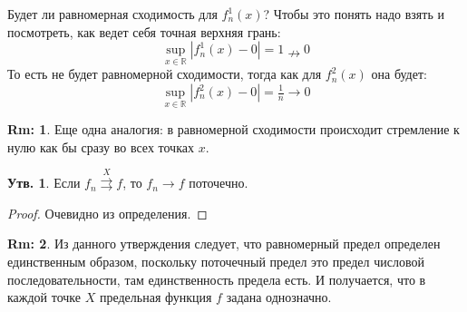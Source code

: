 \documentclass[12pt]{article}
\newcommand{\MR}{\mathbb{R}}
\theoremstyle{definition}
\newtheorem{rem}{Rm:}
\newtheorem{prop}{Утв.}
\newcommand{\uconv}[1]{\overset{#1}{\rightrightarrows}}
\begin{document}
Будет ли равномерная сходимость для $f^1_n(x)$? Чтобы это понять надо взять и посмотреть, как ведет себя точная верхняя грань:
$$
	\sup\limits_{x \in \MR}|f_n^1(x) - 0| = 1 \nrightarrow 0
$$
То есть не будет равномерной сходимости, тогда как для $f^2_n(x)$ она будет:
$$
	\sup\limits_{x \in \MR}|f_n^2(x) - 0| = \tfrac{1}{n} \rightarrow 0
$$
\begin{rem}
	Еще одна аналогия: в равномерной сходимости происходит стремление к нулю как бы сразу во всех точках $x$.
\end{rem}
\newpage
\begin{prop}
	Если $f_n \uconv{X} f$, то $f_n \to f$ поточечно.
\end{prop}
\begin{proof}
	Очевидно из определения.
\end{proof}
\begin{rem}
	Из данного утверждения следует, что равномерный предел определен единственным образом, поскольку поточечный предел это предел числовой последовательности, там единственность предела есть. И получается, что в каждой точке $X$ предельная функция $f$ задана однозначно.
\end{rem}
\end{document}
